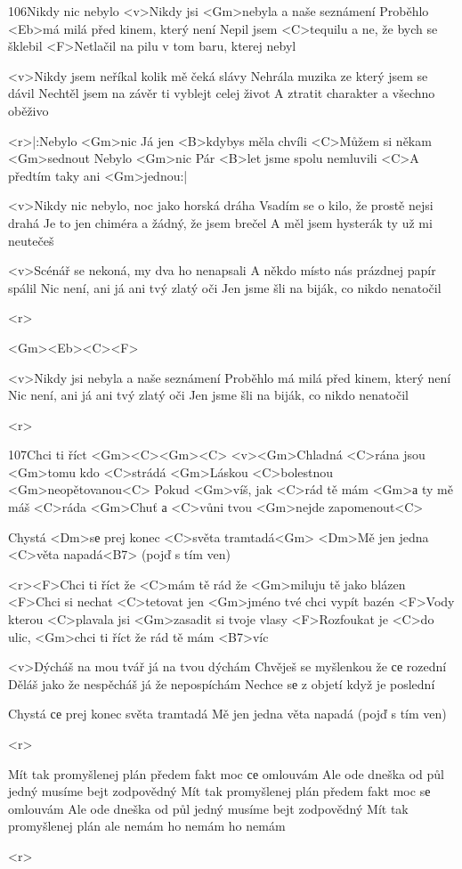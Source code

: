 \begin{song}{106}{Nikdy nic nebylo}{}
<v>Nikdy jsi <Gm>nebyla a naše seznámení
Proběhlo <Eb>má milá před kinem, který není
Nepil jsem <C>tequilu a ne, že bych se šklebil
<F>Netlačil na pilu v tom baru, kterej nebyl

<v>Nikdy jsem neříkal kolik mě čeká slávy
Nehrála muzika ze který jsem se dávil
Nechtěl jsem na závěr ti vyblejt celej život
A ztratit charakter a všechno oběživo

<r>|:Nebylo <Gm>nic
Já jen <B>kdybys měla chvíli
<C>Můžem si někam <Gm>sednout
Nebylo <Gm>nic
Pár <B>let jsme spolu nemluvili
<C>A předtím taky ani <Gm>jednou:|

<v>Nikdy nic nebylo, noc jako horská dráha
Vsadím se o kilo, že prostě nejsi drahá
Je to jen chiméra a žádný, že jsem brečel
A měl jsem hysterák ty už mi neutečeš

<v>Scénář se nekoná, my dva ho nenapsali
A někdo místo nás prázdnej papír spálil
Nic není, ani já ani tvý zlatý oči
Jen jsme šli na biják, co nikdo nenatočil

<r>

<Gm><Eb><C><F>

<v>Nikdy jsi nebyla a naše seznámení
Proběhlo má milá před kinem, který není
Nic není, ani já ani tvý zlatý oči
Jen jsme šli na biják, co nikdo nenatočil

<r>
\end{song}
\begin{song}[Mig 21]{107}{Chci ti říct}{}
<Gm><C><Gm><C>
<v><Gm>Chladná <C>rána jsou <Gm>tomu kdo <C>strádá
<Gm>Láskou <C>bolestnou <Gm>neopětovanou<C>
Pokud <Gm>víš, jak <C>rád tě mám <Gm>а ty mě máš <C>ráda
<Gm>Chuť а <C>vůni tvou <Gm>nejde zapomenout<C>

Chystá <Dm>sе prej konec <C>světa tramtadá<Gm>
<Dm>Mě jen jedna <C>věta napadá<B7> (pojď s tím ven)

<r><F>Chci ti říct že <C>mám tě rád že <Gm>miluju tě jako blázen
<F>Chci si nechat <C>tetovat jen <Gm>jméno tvé chci vypít bazén
<F>Vody kterou <C>plavala jsi <Gm>zasadit si tvoje vlasy 
<F>Rozfoukat je <C>do ulic, <Gm>chci ti říct že rád tě mám <B7>víc

<v>Dýcháš na mou tvář já na tvou dýchám
Chvěješ se myšlenkou že се rozední
Děláš jako že nespěcháš já že nepospíchám
Nechce sе z objetí když je poslední

Chystá се prej konec světa tramtadá
Mě jen jedna věta napadá (pojď s tím ven)

<r>

Mít tak promyšlenej plán předem fakt moc се omlouvám
Ale ode dneška od půl jedný musíme bejt zodpovědný
Mít tak promyšlenej plán předem fakt moc sе omlouvám
Ale ode dneška od půl jedný musíme bejt zodpovědný
Mít tak promyšlenej plán ale nemám ho nemám ho nemám

<r>
\end{song}
